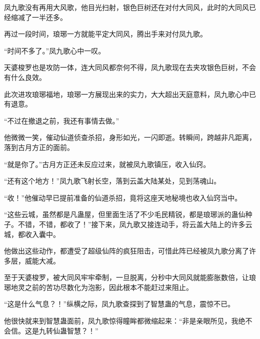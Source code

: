 \begin{this_body}
凤九歌没有再用大风歌，他目光扫射，银色巨树还在对付大同风，此时的大同风已经缩减了一半还多。

再过一段时间，琅琊一方就能平定大同风，腾出手来对付凤九歌。

“时间不多了。”凤九歌心中一叹。

天婆梭罗也是攻防一体，连大同风都奈何不得，凤九歌现在去夹攻银色巨树，不会有什么良效。

此次进攻琅琊福地，琅琊一方展现出来的实力，大大超出天庭意料，凤九歌心中已有退意。

“不过在撤退之前，我还有事情去做。”

他微微一笑，催动仙道侦查杀招，身形如光，一闪即逝。转瞬间，跨越非凡距离，落到古月方正的面前。

“就是你了。”古月方正还未反应过来，就被凤九歌镇压，收入仙窍。

“还有这个地方！”凤九歌飞射长空，落到云盖大陆某处，见到荡魂山。

“收！”他催动早已提前准备的仙道杀招，竟将这座天地秘境也收入仙窍当中。

“这些云城，虽然都是凡蛊屋，但里面生活了不少毛民精锐，都是琅琊派的蛊仙种子。不错，不错，都收了！”接下来，凤九歌又接连动手，将云盖大陆上的许多云城，都收入囊中。

他做出这些动作，都遭受了超级仙阵的疯狂阻击，可惜此阵已经被凤九歌分离了许多层，威能大减。

至于天婆梭罗，被大同风牢牢牵制，一旦脱离，分秒中大同风就能膨胀数倍，让琅琊地灵之前的苦功尽数化为泡影，因此根本不能赶过来阻止。

“这是什么气息？！”纵横之际，凤九歌查探到了智慧蛊的气息，震惊不已。

他很快就来到智慧蛊面前，凤九歌惊得瞳眸都微缩起来：“非是亲眼所见，我绝不会信。这是九转仙蛊智慧？！”

\end{this_body}

